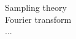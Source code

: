 \documentclass[preview]{standalone}
\begin{document}
Sampling theory\\Fourier transform\\...\\
\end{document}
